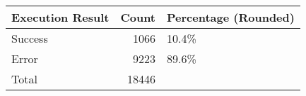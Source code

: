 \begin{tabular}{lrl}
\toprule
Execution Result &  Count & Percentage (Rounded) \\
\midrule
         Success &   1066 &                10.4\% \\ \hline
           Error &   9223 &                89.6\% \\ \hline
           Total &  18446 &                      \\
\bottomrule
\end{tabular}
